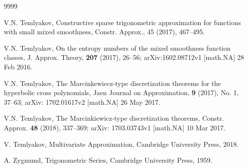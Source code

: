 \documentclass[12pt]{article}
\numberwithin{equation}{section}
\begin{document}
\begin{thebibliography}{9999}

 V.N. Temlyakov, Constructive sparse trigonometric approximation for functions with small mixed smoothness, Constr. Approx., 45 (2017), 467--495.

 V.N. Temlyakov, On the entropy numbers of the mixed smoothness function classes, J. Approx. Theory, {\bf 207} (2017), 26--56; arXiv:1602.08712v1 [math.NA] 28 Feb 2016.

 V.N. Temlyakov, The Marcinkewiecz-type discretization theorems for the hyperbolic cross polynomials, Jaen  Journal on Approximation, {\bf 9} (2017), No. 1, 37--63; arXiv: 1702.01617v2 [math.NA] 26 May 2017.

 V.N. Temlyakov, The Marcinkiewicz-type discretization theorems, Constr. Approx. {\bf 48} (2018), 337--369; arXiv: 1703.03743v1 [math.NA] 10 Mar 2017.

 V. Temlyakov, Multivariate Approximation, Cambridge University Press, 2018.



 A. Zygmund, Trigonometric Series, Cambridge University Press, 1959.

\end{thebibliography}

 \Addresses
\end{document}
